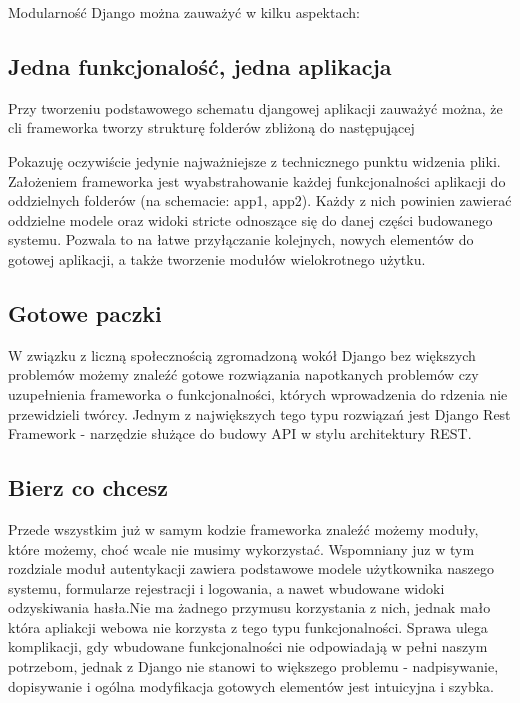 Modularność Django można zauważyć w kilku aspektach: 

\subsection{Jedna funkcjonalość, jedna aplikacja}
Przy tworzeniu podstawowego schematu djangowej aplikacji zauważyć można, że cli frameworka tworzy strukturę folderów zbliżoną do następującej

Pokazuję oczywiście jedynie najważniejsze z technicznego punktu widzenia pliki. Założeniem frameworka jest wyabstrahowanie każdej funkcjonalności aplikacji do oddzielnych folderów (na schemacie: app1, app2). Każdy z nich powinien zawierać oddzielne modele oraz widoki stricte odnoszące się do danej części budowanego systemu. Pozwala to na łatwe przyłączanie kolejnych, nowych elementów do gotowej aplikacji, a także tworzenie modułów wielokrotnego użytku.

\subsection{Gotowe paczki}
W związku z liczną społecznością zgromadzoną wokół Django bez większych problemów możemy znaleźć gotowe rozwiązania napotkanych problemów czy uzupełnienia frameworka o funkcjonalności, których wprowadzenia do rdzenia nie przewidzieli twórcy. Jednym z największych tego typu rozwiązań jest Django Rest Framework - narzędzie służące do budowy API w stylu architektury REST.

\subsection{Bierz co chcesz}
Przede wszystkim już w samym kodzie frameworka znaleźć możemy moduły, które możemy, choć wcale nie musimy wykorzystać. Wspomniany juz w tym rozdziale moduł autentykacji zawiera podstawowe modele użytkownika naszego systemu, formularze rejestracji i logowania, a nawet wbudowane widoki odzyskiwania hasła.Nie ma żadnego przymusu korzystania z nich, jednak mało która apliakcji webowa nie korzysta z tego typu funkcjonalności. Sprawa ulega komplikacji, gdy wbudowane funkcjonalności nie odpowiadają w pełni naszym potrzebom, jednak z Django nie stanowi to większego problemu - nadpisywanie, dopisywanie i ogólna modyfikacja gotowych elementów jest intuicyjna i szybka.

